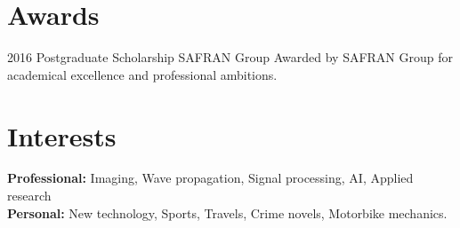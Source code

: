 \documentclass[]{friggeri-cv} %
\begin{document}

\section{Awards}

\begin{entrylist}
	
	
	\entry
	{2016}
	{Postgraduate Scholarship}
	{SAFRAN Group}
	{Awarded by SAFRAN Group for academical excellence and professional ambitions.}
	
	
\end{entrylist}


\section{Interests}

\textbf{Professional:} Imaging, Wave propagation, Signal processing, AI, Applied research \\ \textbf{Personal:} New technology, Sports, Travels, Crime novels, Motorbike mechanics.
\end{document}
